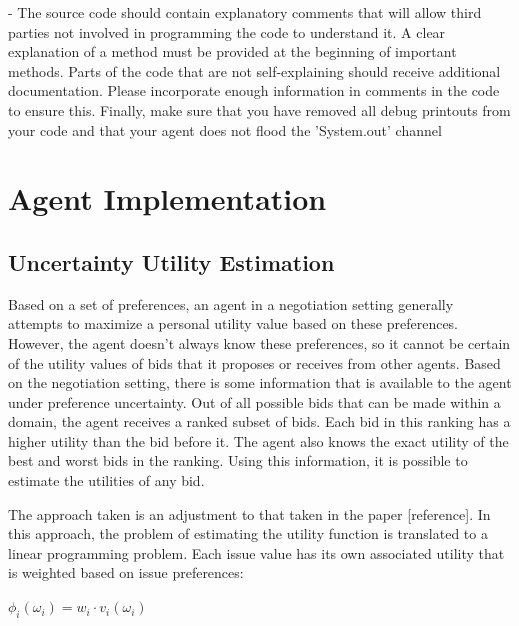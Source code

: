\documentclass[a4paper,11pt]{article}
\theoremstyle{mytheor}
\begin{document}
- The source code should contain explanatory comments that will allow third parties not involved
in programming the code to understand it. A clear explanation of a method must be provided at
the beginning of important methods. Parts of the code that are not self-explaining should receive
additional documentation. Please incorporate enough information in comments in the code to ensure
this. Finally, make sure that you have removed all debug printouts from your code and that your
agent does not flood the ’System.out’ channel \newline

\section{Agent Implementation}
\subsection{Uncertainty Utility Estimation}
Based on a set of preferences, an agent in a negotiation setting generally attempts to maximize a personal utility value based on these preferences. However, the agent doesn't always know these preferences, so it cannot be certain of the utility values of bids that it proposes or receives from other agents. Based on the negotiation setting, there is some information that is available to the agent under preference uncertainty. Out of all possible bids that can be made within a domain, the agent receives a ranked subset of bids. Each bid in this ranking has a higher utility than the bid before it. The agent also knows the exact utility of the best and worst bids in the ranking. Using this information, it is possible to estimate the utilities of any bid. \newline

The approach taken is an adjustment to that taken in the paper [reference]. In this approach, the problem of estimating the utility function is translated to a linear programming problem. Each issue value has its own associated utility that is weighted based on issue preferences:

\begin{center}
    $\phi_i(\omega_i) = w_i · v_i(\omega_i)$ \\
\end{center}
\end{document}
